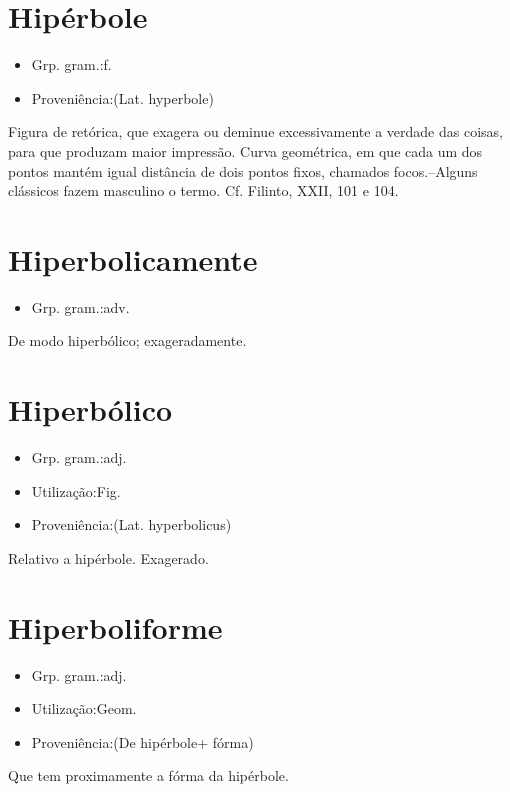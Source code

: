 \documentclass{article}
\begin{document}
\section{Hipérbole}
\begin{itemize}
\item {Grp. gram.:f.}
\end{itemize}
\begin{itemize}
\item {Proveniência:(Lat. \textunderscore hyperbole\textunderscore )}
\end{itemize}
Figura de retórica, que exagera ou deminue excessivamente a verdade das coisas, para que produzam maior impressão.
Curva geométrica, em que cada um dos pontos mantém igual distância de dois pontos fixos, chamados focos.--Alguns clássicos fazem masculino o termo. Cf. Filinto, XXII, 101 e 104.
\section{Hiperbolicamente}
\begin{itemize}
\item {Grp. gram.:adv.}
\end{itemize}
De modo hiperbólico; exageradamente.
\section{Hiperbólico}
\begin{itemize}
\item {Grp. gram.:adj.}
\end{itemize}
\begin{itemize}
\item {Utilização:Fig.}
\end{itemize}
\begin{itemize}
\item {Proveniência:(Lat. \textunderscore hyperbolicus\textunderscore )}
\end{itemize}
Relativo a hipérbole.
Exagerado.
\section{Hiperboliforme}
\begin{itemize}
\item {Grp. gram.:adj.}
\end{itemize}
\begin{itemize}
\item {Utilização:Geom.}
\end{itemize}
\begin{itemize}
\item {Proveniência:(De \textunderscore hipérbole\textunderscore  + \textunderscore fórma\textunderscore )}
\end{itemize}
Que tem proximamente a fórma da hipérbole.
\end{document}
